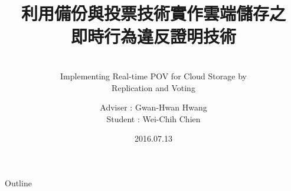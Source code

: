 \documentclass[utf8]{beamer}
\title[Oral Presentation]{利用備份與投票技術實作雲端儲存之\\ 即時行為違反證明技術}
\subtitle{~\\ Implementing Real-time POV for Cloud Storage by\\ Replication and Voting}
\author[Wei-Chih Chien]{Adviser : Gwan-Hwan Hwang \texorpdfstring{\\ Student : Wei-Chih Chien}{}}
\institute[NTNU CSIE CCLAB]{NTNU CSIE CCLAB}
\date{2016.07.13}
\begin{document}
\begin{frame}
  \titlepage
\end{frame}

\begin{frame}{Outline}
  \tableofcontents
\end{frame}






\end{document}

